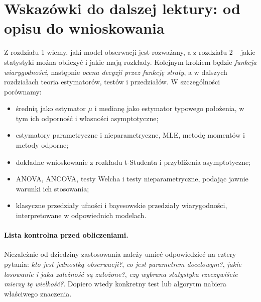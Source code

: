 \section{Wskazówki do dalszej lektury: od opisu do wnioskowania}
Z rozdziału 1 wiemy, jaki model obserwacji jest rozważany, a z rozdziału 2 -- jakie statystyki można obliczyć i jakie mają rozkłady. Kolejnym krokiem będzie \emph{funkcja wiarygodności}, następnie \emph{ocena decyzji przez funkcję straty}, a w dalszych rozdziałach teoria estymatorów, testów i przedziałów. W szczególności porównamy:
\begin{itemize}
\item średnią jako estymator $\mu$ i medianę jako estymator typowego położenia, w tym ich odporność i własności asymptotyczne;
\item estymatory parametryczne i nieparametryczne, MLE, metodę momentów i metody odporne;
\item dokładne wnioskowanie z rozkładu t-Studenta i przybliżenia asymptotyczne;
\item ANOVA, ANCOVA, testy Welcha i testy nieparametryczne, podając jawnie warunki ich stosowania;
\item klasyczne przedziały ufności i bayesowskie przedziały wiarygodności, interpretowane w odpowiednich modelach.
\end{itemize}

\paragraph{Lista kontrolna przed obliczeniami.}
Niezależnie od dziedziny zastosowania należy umieć odpowiedzieć na cztery pytania: \emph{kto jest jednostką obserwacji?}, \emph{co jest parametrem docelowym?}, \emph{jakie losowanie i jaka zależność są założone?}, \emph{czy wybrana statystyka rzeczywiście mierzy tę wielkość?}. Dopiero wtedy konkretny test lub algorytm nabiera właściwego znaczenia.


